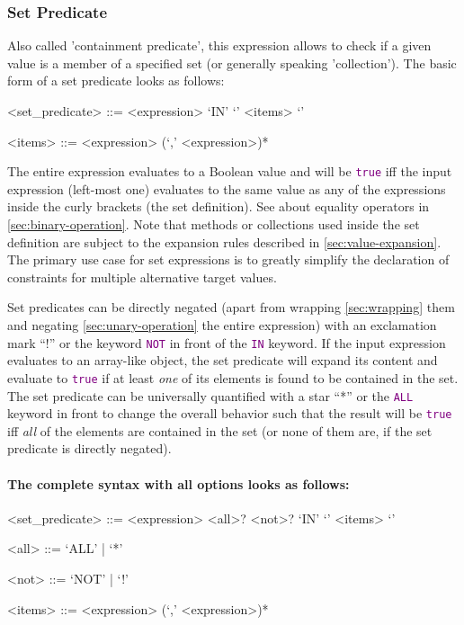 \documentclass[11pt,a4paper,portrait]{article}
\newcommand{\keyword}[1]{\textcolor{purple}{\texttt{#1}}}
\begin{document}
\subsubsection{Set Predicate}
\label{sec:set-predicate}

Also called 'containment predicate', this expression allows to check if a given value is a member of a specified set (or generally speaking 'collection'). The basic form of a set predicate looks as follows:
\begin{grammar}	
	<set_predicate> ::= <expression> `IN' `{' <items> `}'
	
	<items> ::= <expression> (`,' <expression>)*
\end{grammar}

\noindent The entire expression evaluates to a Boolean value and will be \keyword{true} iff the input expression (left-most one) evaluates to the same value as any of the expressions inside the curly brackets (the set definition). See about equality operators in \cref{sec:binary-operation}. Note that methods or collections used inside the set definition are subject to the expansion rules described in \cref{sec:value-expansion}. The primary use case for set expressions is to greatly simplify the declaration of constraints for multiple alternative target values. 

Set predicates can be directly negated (apart from wrapping \ref{sec:wrapping} them and negating \ref{sec:unary-operation} the entire expression) with an exclamation mark ``!'' or the keyword \keyword{NOT} in front of the \keyword{IN} keyword. If the input expression evaluates to an array-like object, the set predicate will expand its content and evaluate to \keyword{true} if at least \textit{one} of its elements is found to be contained in the set. The set predicate can be universally quantified with a star ``*'' or the \keyword{ALL} keyword in front to change the overall behavior such that the result will be \keyword{true} iff \textit{all} of the elements are contained in the set (or none of them are, if the set predicate is directly negated).

\paragraph{The complete syntax with all options looks as follows:}
\begin{grammar}	
	<set_predicate> ::= <expression> <all>? <not>? `IN' `{' <items> `}'
	
	<all> ::=  `ALL' | `*'
	
	<not> ::=  `NOT' | `!'
	
	<items> ::= <expression> (`,' <expression>)*
\end{grammar}
\end{document}
